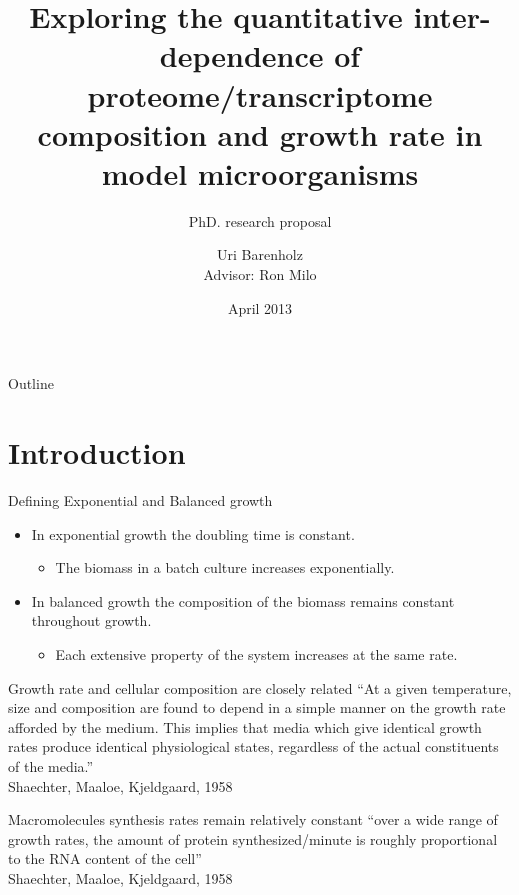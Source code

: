 \documentclass{beamer}
\title{Exploring the quantitative inter-dependence of proteome/transcriptome composition and growth rate in model microorganisms}
\subtitle{PhD. research proposal}
\author{Uri Barenholz\\ Advisor: Ron Milo}
\institute[The Weizmann Institute of Science]
{
        Department of Plant sciences
}
\date{April 2013}
\begin{document}
\begin{frame}
    \titlepage
\end{frame}
\begin{frame}{Outline}
    \tableofcontents
\end{frame}

\section{Introduction}
    \begin{frame}{Defining Exponential and Balanced growth}
        \begin{itemize}
        \item {In exponential growth the doubling time is constant.}
            \begin{itemize}
            \item {The biomass in a batch culture increases exponentially.}
            \end{itemize}
        \item {In balanced growth the composition of the biomass remains constant throughout growth.}
            \begin{itemize}
            \item {Each extensive property of the system increases at the same rate.}
            \end{itemize}
        \end{itemize}
    \end{frame}
    \begin{frame}{Growth rate and cellular composition are closely related}
        ``At a given temperature, size and composition are found to depend in a simple manner on the growth rate afforded by the medium.
This implies that media which give identical growth rates produce identical physiological states, regardless of the actual constituents of the media.''
        \\ \hfill \footnotesize{Shaechter, Maaloe, Kjeldgaard, 1958}
    \end{frame}
    \begin{frame}{Macromolecules synthesis rates remain relatively constant}
        ``over a wide range of growth rates, the amount of protein synthesized/minute is roughly proportional to the RNA content of the cell''
        \\ \hfill \footnotesize{Shaechter, Maaloe, Kjeldgaard, 1958}
    \end{frame}
\end{document}
